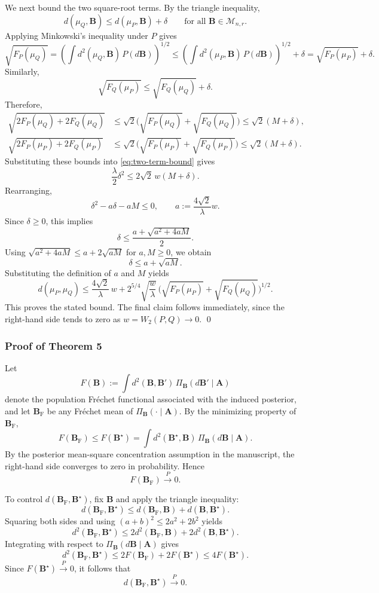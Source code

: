 \documentclass[12pt]{article}
\newcommand{\calMnr}{\mathcal{M}_{n,r}}
\newcommand{\bfA}{\boldsymbol{A}}
\newcommand{\bfB}{\boldsymbol{B}}
\newcommand{\Frechet}{Fr\'{e}chet\xspace}
\newcommand{\BF}{\bfB_{\mathrm{F}}}
\begin{document}
We next bound the two square-root terms. By the triangle inequality,
\[
d(\mu_Q,\bfB)\le d(\mu_P,\bfB)+\delta
\qquad\text{for all }\bfB\in\calMnr.
\]
Applying Minkowski's inequality under $P$ gives
\[
\sqrt{F_P(\mu_Q)}
=
\left(\int d^2(\mu_Q,\bfB)\,P(d\bfB)\right)^{1/2}
\le
\left(\int d^2(\mu_P,\bfB)\,P(d\bfB)\right)^{1/2}+\delta
=
\sqrt{F_P(\mu_P)}+\delta.
\]
Similarly,
\[
\sqrt{F_Q(\mu_P)}\le \sqrt{F_Q(\mu_Q)}+\delta.
\]
Therefore,
\begin{align*}
	\sqrt{2F_P(\mu_Q)+2F_Q(\mu_Q)}
	&\le
	\sqrt{2}\big(\sqrt{F_P(\mu_Q)}+\sqrt{F_Q(\mu_Q)}\big)
	\le
	\sqrt{2}(M+\delta),\\
	\sqrt{2F_P(\mu_P)+2F_Q(\mu_P)}
	&\le
	\sqrt{2}\big(\sqrt{F_P(\mu_P)}+\sqrt{F_Q(\mu_P)}\big)
	\le
	\sqrt{2}(M+\delta).
\end{align*}
Substituting these bounds into \eqref{eq:two-term-bound} gives
\[
\frac{\lambda}{2}\delta^2 \le 2\sqrt{2}\,w(M+\delta).
\]
Rearranging,
\[
\delta^2 - a\delta - aM \le 0,
\qquad
a:=\frac{4\sqrt{2}}{\lambda}w.
\]
Since $\delta\ge 0$, this implies
\[
\delta \le \frac{a+\sqrt{a^2+4aM}}{2}.
\]
Using $\sqrt{a^2+4aM}\le a+2\sqrt{aM}$ for $a,M\ge 0$, we obtain
\[
\delta \le a+\sqrt{aM}.
\]
Substituting the definition of $a$ and $M$ yields
\[
d(\mu_P,\mu_Q)
\le
\frac{4\sqrt{2}}{\lambda}\,w
+
2^{5/4}\sqrt{\frac{w}{\lambda}}\,
\Big(\sqrt{F_P(\mu_P)}+\sqrt{F_Q(\mu_Q)}\Big)^{1/2}.
\]
This proves the stated bound. The final claim follows immediately, since the right-hand side tends
to zero as $w=W_2(P,Q)\to 0$.
\qed

\subsubsection*{Proof of Theorem 5}
Let
\[
F(\bfB):=\int d^2(\bfB,\bfB')\,\Pi_{\bfB}(d\bfB'\mid \bfA)
\]
denote the population \Frechet functional associated with the induced posterior, and let
$\BF$ be any \Frechet mean of $\Pi_{\bfB}(\cdot\mid \bfA)$. By the minimizing property of
$\BF$,
\[
F(\BF)\le F(\bfB^\star)
=
\int d^2(\bfB^\star,\bfB)\,\Pi_{\bfB}(d\bfB\mid \bfA).
\]
By the posterior mean-square concentration assumption in the manuscript, the right-hand side
converges to zero in probability. Hence
\[
F(\BF)\xrightarrow{P}0.
\]

To control $d(\BF,\bfB^\star)$, fix $\bfB$ and apply the triangle inequality:
\[
d(\BF,\bfB^\star)\le d(\BF,\bfB)+d(\bfB,\bfB^\star).
\]
Squaring both sides and using $(a+b)^2\le 2a^2+2b^2$ yields
\[
d^2(\BF,\bfB^\star)\le 2d^2(\BF,\bfB)+2d^2(\bfB,\bfB^\star).
\]
Integrating with respect to $\Pi_{\bfB}(d\bfB\mid \bfA)$ gives
\[
d^2(\BF,\bfB^\star)
\le
2F(\BF) + 2F(\bfB^\star)
\le
4F(\bfB^\star).
\]
Since $F(\bfB^\star)\xrightarrow{P}0$, it follows that
\[
d(\BF,\bfB^\star)\xrightarrow{P}0.
\]
\end{document}
